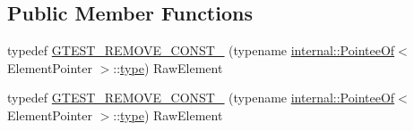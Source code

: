 \subsection*{Public Member Functions}
\begin{DoxyCompactItemize}
\item 
typedef \mbox{\hyperlink{classtesting_1_1internal_1_1_stl_container_view_3_01_1_1std_1_1tuple_3_01_element_pointer_00_01_size_01_4_01_4_a860d053b2a834fa591f4340c3778e63c}{G\+T\+E\+S\+T\+\_\+\+R\+E\+M\+O\+V\+E\+\_\+\+C\+O\+N\+S\+T\+\_\+}} (typename \mbox{\hyperlink{structtesting_1_1internal_1_1_pointee_of}{internal\+::\+Pointee\+Of}}$<$ Element\+Pointer $>$\+::\mbox{\hyperlink{classtesting_1_1internal_1_1_stl_container_view_3_01_1_1std_1_1tuple_3_01_element_pointer_00_01_size_01_4_01_4_aaa0289cd65ef99ea632d2fb0ad5480eb}{type}}) Raw\+Element
\item 
typedef \mbox{\hyperlink{classtesting_1_1internal_1_1_stl_container_view_3_01_1_1std_1_1tuple_3_01_element_pointer_00_01_size_01_4_01_4_a860d053b2a834fa591f4340c3778e63c}{G\+T\+E\+S\+T\+\_\+\+R\+E\+M\+O\+V\+E\+\_\+\+C\+O\+N\+S\+T\+\_\+}} (typename \mbox{\hyperlink{structtesting_1_1internal_1_1_pointee_of}{internal\+::\+Pointee\+Of}}$<$ Element\+Pointer $>$\+::\mbox{\hyperlink{classtesting_1_1internal_1_1_stl_container_view_3_01_1_1std_1_1tuple_3_01_element_pointer_00_01_size_01_4_01_4_aaa0289cd65ef99ea632d2fb0ad5480eb}{type}}) Raw\+Element
\end{DoxyCompactItemize}
